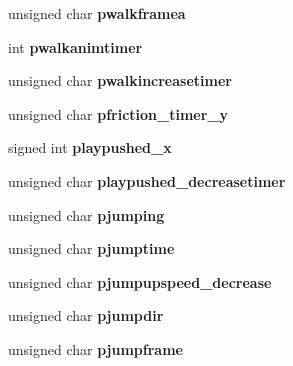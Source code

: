 \begin{DoxyCompactItemize}
\item 
\hypertarget{class_c_player_acc029032cb1b9fbefa057ffb409d380c}{
unsigned char {\bfseries pwalkframea}}
\label{class_c_player_acc029032cb1b9fbefa057ffb409d380c}

\item 
\hypertarget{class_c_player_a0fe9eebff654e8d675b76837fe318404}{
int {\bfseries pwalkanimtimer}}
\label{class_c_player_a0fe9eebff654e8d675b76837fe318404}

\item 
\hypertarget{class_c_player_ada9fdd9722534bb41c77b6ee978a9810}{
unsigned char {\bfseries pwalkincreasetimer}}
\label{class_c_player_ada9fdd9722534bb41c77b6ee978a9810}

\item 
\hypertarget{class_c_player_a7d31b0edcba6885234bf654d95f1f798}{
unsigned char {\bfseries pfriction\_\-timer\_\-y}}
\label{class_c_player_a7d31b0edcba6885234bf654d95f1f798}

\item 
\hypertarget{class_c_player_a4c5d719a52172c4535ea461c437ff1e7}{
signed int {\bfseries playpushed\_\-x}}
\label{class_c_player_a4c5d719a52172c4535ea461c437ff1e7}

\item 
\hypertarget{class_c_player_ae1d06948eace0ef1271f2a8bb6a25bdf}{
unsigned char {\bfseries playpushed\_\-decreasetimer}}
\label{class_c_player_ae1d06948eace0ef1271f2a8bb6a25bdf}

\item 
\hypertarget{class_c_player_a2d53b3f230aa0f787f8c78169df60f78}{
unsigned char {\bfseries pjumping}}
\label{class_c_player_a2d53b3f230aa0f787f8c78169df60f78}

\item 
\hypertarget{class_c_player_af6094769a42090c66c8e84105795906e}{
unsigned char {\bfseries pjumptime}}
\label{class_c_player_af6094769a42090c66c8e84105795906e}

\item 
\hypertarget{class_c_player_ae49ab510990062c0647affdfb7d31f6b}{
unsigned char {\bfseries pjumpupspeed\_\-decrease}}
\label{class_c_player_ae49ab510990062c0647affdfb7d31f6b}

\item 
\hypertarget{class_c_player_a65ed7321fba5e0e489b67d3114d5c976}{
unsigned char {\bfseries pjumpdir}}
\label{class_c_player_a65ed7321fba5e0e489b67d3114d5c976}

\item 
\hypertarget{class_c_player_a8d62a808029003f59039e75da832dbc2}{
unsigned char {\bfseries pjumpframe}}
\label{class_c_player_a8d62a808029003f59039e75da832dbc2}


\end{DoxyCompactItemize}
